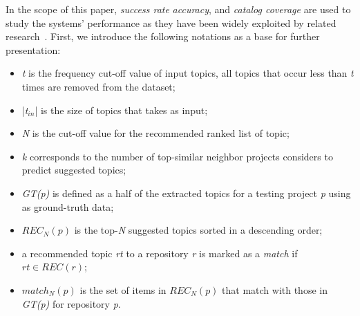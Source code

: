 In the scope of this paper, \emph{success rate} \emph{accuracy}, and \emph{catalog coverage} are used to study the systems' performance as they have been widely exploited by related research~\cite{Robillard:2014:RSS:2631387}. 
First, we introduce the following notations as a base for further presentation:%
\begin{itemize}[noitemsep,topsep=0pt]
	\item \emph{t} is the frequency cut-off value of input topics, \ie all topics that occur less than \emph{t} times are removed from the dataset;
	\item |\emph{t$_{in}$}| is the size of topics that \TF takes as input;
	\item \emph{N} is the cut-off value for the recommended ranked list of topic;%
	\item \emph{k} corresponds to the number of top-similar neighbor projects \TF considers to predict suggested topics;
	\item \emph{GT(p)} is defined as a half of the extracted topics for a testing project \emph{p} using as ground-truth data;%
	\item $REC_{N}(p)$ is the top-\emph{N}  suggested topics sorted in a descending order;%
	\item a recommended topic \emph{rt} to a repository \emph{r} is marked as a \emph{match} if $rt \in REC(r)$;
	\item  $match_{N}(p)$ is the set of items in $REC_{N}(p)$ that match with those in \emph{GT(p)} for repository \emph{p}.
\end{itemize}

